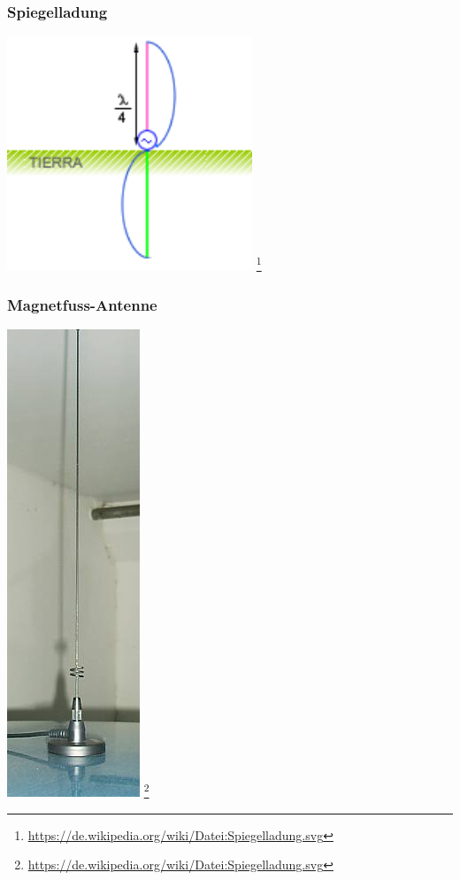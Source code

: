 \begin{frame}
    \frametitle{Spiegelladung}
    \begin{center}
        \includegraphics[width=0.55\textwidth]{e11/Antena_marconi501.png}
                \footnote{\tiny \url{https://de.wikipedia.org/wiki/Datei:Spiegelladung.svg}}
	\end{center}
\end{frame}

\begin{frame}
    \frametitle{Magnetfuss-Antenne}
    \begin{center}
        \includegraphics[height=0.8\textheight]{e11/magnetfuss.jpg}
                \footnote{\tiny \url{https://de.wikipedia.org/wiki/Datei:Spiegelladung.svg}}
	\end{center}
\end{frame}


